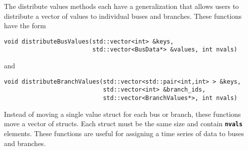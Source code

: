 The distribute values methods each have a generalization that allows users to distribute a vector of values to individual buses and branches. These functions have the form

{
\color{red}
\begin{Verbatim}[fontseries=b]
void distributeBusValues(std::vector<int> &keys,
                         std::vector<BusData*> &values, int nvals)
\end{Verbatim}
}

and

{
\color{red}
\begin{Verbatim}[fontseries=b]
void distributeBranchValues(std::vector<std::pair<int,int> > &keys,
                            std::vector<int> &branch_ids,
                            std::vector<BranchValues*>, int nvals)
\end{Verbatim}
}

Instead of moving a single value struct for each bus or branch, these functions
move a vector of structs. Each struct must be the same size and contain
\texttt{\textbf{nvals}} elements. These functions are useful for assigning a time series of data to buses and branches.
